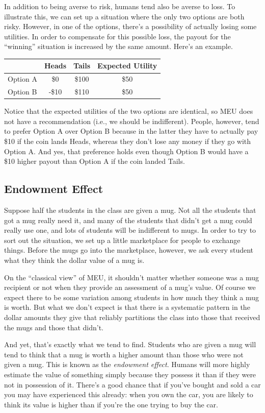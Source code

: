 \documentclass[]{tufte-book}
\begin{document}
In addition to being averse to risk, humans tend also be averse to loss. To illustrate this, we can set up a situation where the only two options are both risky. However, in one of the options, there's a possibility of actually losing some utilities. In order to compensate for this possible loss, the payout for the ``winning'' situation is increased by the same amount. Here's an example.

\begin{longtable}[]{@{}lccc@{}}
\toprule
& Heads & Tails & Expected Utility\tabularnewline
\midrule
\endhead
Option A & \$0 & \$100 & \$50\tabularnewline
Option B & -\$10 & \$110 & \$50\tabularnewline
\bottomrule
\end{longtable}

Notice that the expected utilities of the two options are identical, so MEU does not have a recommendation (i.e., we should be indifferent). People, however, tend to prefer Option A over Option B because in the latter they have to actually pay \$10 if the coin lands Heads, whereas they don't lose any money if they go with Option A. And yes, that preference holds even though Option B would have a \$10 higher payout than Option A if the coin landed Tails.

\hypertarget{endowment-effect}{%
\subsection{Endowment Effect}\label{endowment-effect}}

Suppose half the students in the class are given a mug. Not all the students that got a mug really need it, and many of the students that didn't get a mug could really use one, and lots of students will be indifferent to mugs. In order to try to sort out the situation, we set up a little marketplace for people to exchange things. Before the mugs go into the marketplace, however, we ask every student what they think the dollar value of a mug is.

On the ``classical view'' of MEU, it shouldn't matter whether someone was a mug recipient or not when they provide an assessment of a mug's value. Of course we expect there to be some variation among students in how much they think a mug is worth. But what we don't expect is that there is a systematic pattern in the dollar amounts they give that reliably partitions the class into those that received the mugs and those that didn't.

And yet, that's exactly what we tend to find. Students who are given a mug will tend to think that a mug is worth a higher amount than those who were not given a mug. This is known as the \emph{endowment effect}. Humans will more highly estimate the value of something simply because they possess it than if they were not in possession of it. There's a good chance that if you've bought and sold a car you may have experienced this already: when you own the car, you are likely to think its value is higher than if you're the one trying to buy the car.
\end{document}
